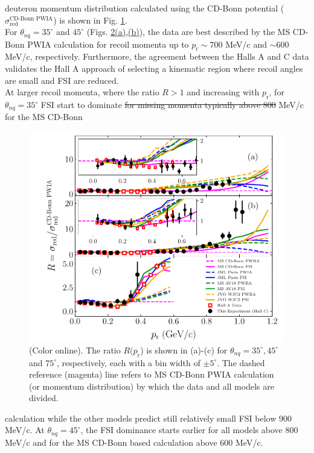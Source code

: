 \documentclass[aps,prl,twocolumn,showpacs,superscriptaddress,groupedaddress]{revtex4-2}  %
\providecommand{\DIFaddtex}[1]{{\protect\color{blue}\uwave{#1}}} %
\providecommand{\DIFdeltex}[1]{{\protect\color{red}\sout{#1}}}                      %
\providecommand{\DIFaddbegin}{} %
\providecommand{\DIFaddend}{} %
\providecommand{\DIFdelbegin}{} %
\providecommand{\DIFdelend}{} %
\providecommand{\DIFadd}[1]{\texorpdfstring{\DIFaddtex{#1}}{#1}} %
\providecommand{\DIFdel}[1]{\texorpdfstring{\DIFdeltex{#1}}{}} %
\newcommand{\DIFscaledelfig}{0.5}
\newlength{\DIFdelgraphicswidth} %
\newlength{\DIFdelgraphicsheight} %
\newcommand{\DIFaddincludegraphics}[2][]{{\color{blue}\fbox{\DIFOincludegraphics[#1]{#2}}}} %
\newcommand{\DIFdelincludegraphics}[2][]{%
\sbox{\DIFdelgraphicsbox}{\DIFOincludegraphics[#1]{#2}}%
\settoboxwidth{\DIFdelgraphicswidth}{\DIFdelgraphicsbox} %
\settoboxtotalheight{\DIFdelgraphicsheight}{\DIFdelgraphicsbox} %
\scalebox{\DIFscaledelfig}{%
\parbox[b]{\DIFdelgraphicswidth}{\usebox{\DIFdelgraphicsbox}\\[-\baselineskip] \rule{\DIFdelgraphicswidth}{0em}}\llap{\resizebox{\DIFdelgraphicswidth}{\DIFdelgraphicsheight}{%
\setlength{\unitlength}{\DIFdelgraphicswidth}%
\begin{picture}(1,1)%
\thicklines\linethickness{2pt} %
{\color[rgb]{1,0,0}\put(0,0){\framebox(1,1){}}}%
{\color[rgb]{1,0,0}\put(0,0){\line( 1,1){1}}}%
{\color[rgb]{1,0,0}\put(0,1){\line(1,-1){1}}}%
\end{picture}%
}\hspace*{3pt}}} %
} %
\DeclareRobustCommand{\DIFaddbegin}{\DIFOaddbegin \let\includegraphics\DIFaddincludegraphics} %
\DeclareRobustCommand{\DIFaddend}{\DIFOaddend \let\includegraphics\DIFOincludegraphics} %
\DeclareRobustCommand{\DIFdelbegin}{\DIFOdelbegin \let\includegraphics\DIFdelincludegraphics} %
\DeclareRobustCommand{\DIFdelend}{\DIFOaddend \let\includegraphics\DIFOincludegraphics} %
\begin{document}
deuteron momentum distribution calculated using the CD-Bonn potential ($\sigma^{\text{CD-Bonn PWIA}}_{\mathrm{red}}$) \cite{PhysRevC.63.024001} is shown in Fig. \ref{fig:fig2}. \\
\indent For $\theta_{nq}=35^{\circ}$ and $45^{\circ}$ (Figs. \hyperref[fig:fig2]{2(a),(b)}), the data are best described by the MS CD-Bonn PWIA calculation for recoil momenta up
to $p_{\mathrm{r}}\sim700$ MeV/c and $\sim600$ MeV/c, respectively. Furthermore, the agreement between the Halls A and C data validates the Hall A approach of selecting a kinematic
region where recoil angles are small and FSI are reduced. \\
\indent At larger recoil momenta, where the ratio $R>1$ and increasing with $p_{\mathrm{r}}$, for $\theta_{nq}=35^{\circ}$ FSI start to dominate \DIFdelbegin \DIFdel{for
missing momenta typically above 800 }\DIFdelend \DIFaddbegin \DIFadd{at
$p_{\mathrm{r}} \gtrsim 800$ }\DIFaddend MeV/c for the MS CD-Bonn
\begin{figure}[!t]
\includegraphics[scale=0.5]{PRL_plot2.pdf}
\caption{(Color online). The ratio $R(p_{\mathrm{r}}$) is shown in (a)-(c) for $\theta_{nq}=35^{\circ}, 45^{\circ}$ and $75^{\circ}$, respectively, each with a bin width of $\pm 5^{\circ}$.
The dashed reference (magenta) line refers to MS CD-Bonn PWIA calculation (or momentum distribution) by which the data and all models are divided.}
\label{fig:fig2}
\end{figure}
calculation while the other models predict still relatively small FSI below 900 MeV/c.
At $\theta_{nq}=45^{\circ}$, the FSI dominance starts earlier for all models above 800 MeV/c and for the MS CD-Bonn based calculation above 600 MeV/c. \\
\end{document}
